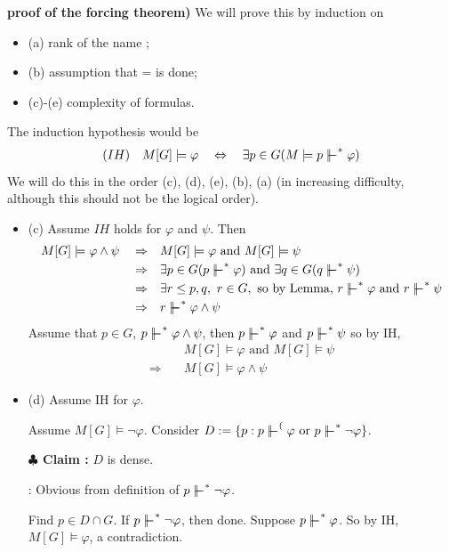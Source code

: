 \documentclass[12pt,a4paper]{article}
\newenvironment{proof}
{\begin{changemargin}{0.5cm}{0.5cm} 
	}%
	{\end{changemargin}
}
\newenvironment{subproof}
{\begin{changemargin}{0.5cm}{0.5cm} 
	}%
	{\end{changemargin}
}
\renewenvironment{i}
{\begin{itemize} 
	}%
	{\end{itemize}
}
\newenvironment{p}
{\begin{proof} 
	}%
	{\end{proof}
}
\begin{document}
\begin{p}
\textbf{proof of the forcing theorem)} We will prove this by induction on
\begin{i}
\item[(a)] rank of the name ;
\item[(b)] assumption that = is done;
\item[(c)-(e)] complexity of formulas.  
\end{i}
The induction hypothesis would be
\begin{align*}
(IH) \quad M[G] \models \varphi \quad \Leftrightarrow \quad \exists p \in G(M\models p\forces^* \varphi)
\end{align*}
We will do this in the order (c), (d), (e), (b), (a) (in increasing difficulty, although this should not be the logical order). 
\begin{i}
\item[(c)] Assume $IH$ holds for $\varphi$ and $\psi$. Then 
\begin{align*}
M[G] \models \varphi \wedge \psi \quad \Rightarrow \quad & M[G] \models \varphi \text{ and } M[G] \models \psi \\
\Rightarrow \quad & \exists p\in G (p\forces^* \varphi) \text{ and } \exists q\in G (q\forces^* \psi)  \\
\Rightarrow \quad & \exists r\leq p, q, \,\, r\in G, \text{ so by Lemma, }r\forces^* \varphi \text{ and } r\forces^* \psi\\
\Rightarrow \quad & r\forces^* \varphi \wedge \psi
\end{align*}
Assume that $p\in G$, $p \forces^* \varphi \wedge \psi$, then $p\forces^* \varphi$ and $p\forces^* \psi$ so by IH,
\begin{align*}
& M[G] \models \varphi \text{ and } M[G] \models \psi \\
\Rightarrow \quad & M[G] \models \varphi \wedge \psi
\end{align*}
\item[(d)] Assume IH for $\varphi$.

\quad Assume $M[G] \models \neg \varphi$. Consider $D:= \{p : p\forces^( \varphi \text{ or } p\forces^* \neg \varphi \}$.

\textbf{$\clubsuit$ Claim :} $D$ is dense.
\begin{subproof}
: Obvious from definition of $p\forces^* \neg \varphi$.
\end{subproof}
Find $p\in D\cap G$. If $p\forces^* \neg \varphi$, then done. Suppose $p\forces^* \varphi$. So by IH, $M[G] \models \varphi$, a contradiction.
\s


\end{i}
\end{p}
\end{document}
